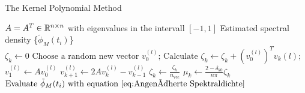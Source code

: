 \begin{algorithm}
    \caption{The Kernel Polynomial Method}\label{alg:cap}
    \begin{algorithmic}[5]
    \Require $A = A^T \in \mathbb{R}^{n \times n}$ with eigenvalues in the intervall $[-1, 1]$
    \Ensure Estimated spectral density \{$\tilde{\phi}_M(t_i)$\}\\
    \State $\zeta_k \gets 0$
    \EndFor
    \State $\text{Choose a random new vector } v_0^{(l)}\text{;}$ 
    \State $\text{Calculate } \zeta_k \gets \zeta_k + \left( v_0^{(l)} \right)^T v_k{(l)}\text{;}$  
    \State $v_1^{(l)} \gets A v_0^{(l)}$
    \Else
    \State $v_{k+1}^{(l)} \gets 2 A v_k^{(l)} - v_{k-1}^{(l)}$ 
    \EndIf
    \EndFor
    \EndFor
    \State $\zeta_k \gets \frac{\zeta_k}{n_{\text{vec}}}$
    \State $\mu_k \gets \frac{2 - \delta_{k0}}{n \pi} \zeta_k$
    \EndFor
    \State $\text{Evaluate } \tilde{\phi}_M(t_i) \text{ with equation } \ref{eq:Angenäherte Spektraldichte}$
    \end{algorithmic}
\end{algorithm}
